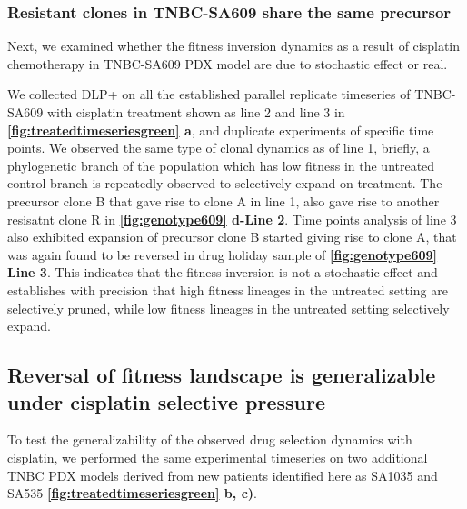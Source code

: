 \subsubsection{Resistant clones in TNBC-SA609 share the same precursor}
Next, we examined whether the fitness inversion dynamics as a result of cisplatin chemotherapy in TNBC-SA609 PDX model are due to stochastic effect or real.

We collected DLP+ on all the established parallel replicate timeseries of TNBC-SA609 with cisplatin treatment shown as line 2 and line 3 in \textbf{\autoref{fig:treatedtimeseriesgreen} a}, and duplicate experiments of specific time points. We observed the same type of clonal dynamics as of line 1, briefly, a phylogenetic branch of the population which has low fitness in the untreated control branch is repeatedly observed to selectively expand on treatment. The precursor clone B that gave rise to clone A in line 1, also gave rise to another resisatnt clone R  in \textbf{\autoref{fig:genotype609} d-Line 2}. Time points analysis of line 3 also exhibited expansion of precursor clone B started giving rise to clone A, that was again found to be reversed in drug holiday sample of \textbf{\autoref{fig:genotype609} Line 3}. This indicates that the fitness inversion is not a stochastic effect and establishes with precision that high fitness lineages in the untreated setting are selectively pruned, while low fitness lineages in the untreated setting selectively expand.


\subsection{Reversal of fitness landscape is generalizable under cisplatin selective pressure}
To test the generalizability of the observed drug selection dynamics with cisplatin, we performed the same experimental timeseries on two additional TNBC PDX models derived from new patients identified here as SA1035 and SA535 \textbf{\autoref{fig:treatedtimeseriesgreen}  b, c)}. 


